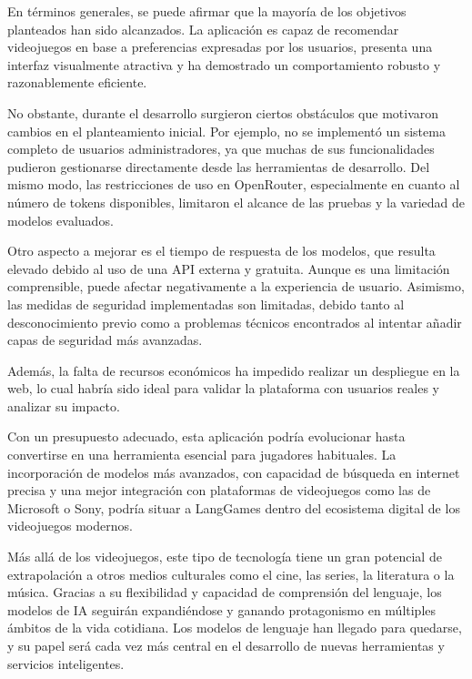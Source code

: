 En términos generales, se puede afirmar que la mayoría de los objetivos planteados han sido alcanzados. La aplicación es capaz de recomendar videojuegos en base a preferencias expresadas por los usuarios, presenta una interfaz visualmente atractiva y ha demostrado un comportamiento robusto y razonablemente eficiente.

No obstante, durante el desarrollo surgieron ciertos obstáculos que motivaron cambios en el planteamiento inicial. Por ejemplo, no se implementó un sistema completo de usuarios administradores, ya que muchas de sus funcionalidades pudieron gestionarse directamente desde las herramientas de desarrollo. Del mismo modo, las restricciones de uso en OpenRouter, especialmente en cuanto al número de tokens disponibles, limitaron el alcance de las pruebas y la variedad de modelos evaluados.


Otro aspecto a mejorar es el tiempo de respuesta de los modelos, que resulta elevado debido al uso de una API externa y gratuita. Aunque es una limitación comprensible, puede afectar negativamente a la experiencia de usuario. Asimismo, las medidas de seguridad implementadas son limitadas, debido tanto al desconocimiento previo como a problemas técnicos encontrados al intentar añadir capas de seguridad más avanzadas.

Además, la falta de recursos económicos ha impedido realizar un despliegue en la web, lo cual habría sido ideal para validar la plataforma con usuarios reales y analizar su impacto.

Con un presupuesto adecuado, esta aplicación podría evolucionar hasta convertirse en una herramienta esencial para jugadores habituales. La incorporación de modelos más avanzados, con capacidad de búsqueda en internet precisa y una mejor integración con plataformas de videojuegos como las de Microsoft o Sony, podría situar a LangGames dentro del ecosistema digital de los videojuegos modernos.

Más allá de los videojuegos, este tipo de tecnología tiene un gran potencial de extrapolación a otros medios culturales como el cine, las series, la literatura o la música. Gracias a su flexibilidad y capacidad de comprensión del lenguaje, los modelos de IA seguirán expandiéndose y ganando protagonismo en múltiples ámbitos de la vida cotidiana. Los modelos de lenguaje han llegado para quedarse, y su papel será cada vez más central en el desarrollo de nuevas herramientas y servicios inteligentes.

\newpage

